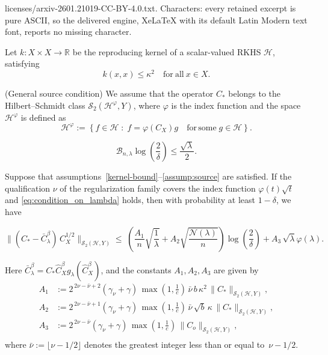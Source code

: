 \documentclass[10pt,a4paper]{amsart}
\begin{document}
licenses/arxiv-2601.21019-CC-BY-4.0.txt. Characters: every retained excerpt is pure ASCII, so the delivered engine, XeLaTeX with its default Latin Modern text font, reports no missing character.
\begin{assumption}\label{kernel-bound}
Let $k : X \times X \to \mathbb{R}$ be the reproducing kernel of a scalar-valued RKHS $\mathcal{H}$, satisfying
\[
k(x,x) \le \kappa^2 \quad \mathrm{for\ all}\ x \in X .
\]
\end{assumption}

\begin{assumption}{(General source condition)}\label{assump:source}
{
We assume that the operator $C_\ast$ belongs to the Hilbert--Schmidt class
$\mathcal S_2(\mathcal H^{\varphi},Y)$, where $\varphi$ is the index function and  the space $\mathcal H^{\varphi}$ is defined as
\[
\mathcal H^{\varphi}
:= \left\{ f \in \mathcal H \;:\; f = \varphi(C_X) g \quad \mathrm{for \, some } \; g \in \mathcal H \right\}.
\]
}
\end{assumption}

\begin{equation}\label{eq:condition_on_lambda}
\mathcal{B}_{n,\lambda}
\log\!\left(\frac{2}{\delta}\right)\leq \frac{\sqrt{\lambda}}{2}.
\end{equation}

\begin{lemma}\label{L_2(lemma-A)}
Suppose that {assumptions~\ref{kernel-bound}--\ref{assump:source}} are satisfied.
If  the qualification $\nu$ of the regularization family covers the index function \(\varphi(t)\sqrt{t}\) and \eqref{eq:condition_on_lambda} holds,
then with probability at least \(1-\delta\), we have

\[\big\|(C_*-\bar{C}_{\lambda}^\beta)\, C_X^{1/2} \big\|_{\mathcal S_2(\mathcal H,Y)} \leq\;
\left(
\frac{A_1}{n}\sqrt{\frac{1}{\lambda}}
+ A_2\sqrt{\frac{\mathcal{N}(\lambda)}{n}}
\right) \log\left(\frac{2}{\delta}\right)
+ A_3\,\sqrt{\lambda}\varphi(\lambda).\]

Here $\bar{C}_{\lambda}^{\beta}
= C_* \widehat{C}_X^{\beta} g_{\lambda}(\widehat{C}_X^{\beta})$,
and the constants $A_1, A_2, A_3$ are given by
\begin{align*}
A_1 &:= 2^{\,2\nu-\bar{\nu}+2}(\gamma_\nu+\gamma)\,
      \max\!\left(1,\frac{1}{c}\right)\,
      \bar{\nu}\, b\, \kappa^2\,
      \| C_{*}\|_{\mathcal S_2(\mathcal H,Y)},\\[4pt]
A_2 &:= 2^{\,2\nu-\bar{\nu}+1}(\gamma_\nu+\gamma)\,
      \max\!\left(1,\frac{1}{c}\right)\,
      \bar{\nu}\,\sqrt{b}\,\kappa\,
      \|C_{*}\|_{\mathcal S_2(\mathcal H,Y)},\\[4pt]
A_3 &:= 2^{\,2\nu-\bar{\nu}}(\gamma_\nu+\gamma)\,
      \max\!\left(1,\frac{1}{c}\right)\,
      \|C_{o}\|_{\mathcal S_2(\mathcal H,Y)},\\[4pt]
\end{align*}
where $\bar{\nu} := \lfloor \nu -1/2 \rfloor$ denotes the greatest integer
less than or equal to~$\nu -1/2$.


    
\end{lemma}
\end{document}

